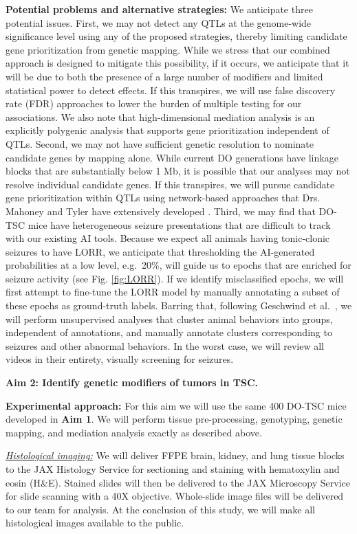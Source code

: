 \documentclass[
  12pt,
]{article}
\begin{document}
\textbf{Potential problems and alternative strategies:} We anticipate
three potential issues. First, we may not detect any QTLs at the
genome-wide significance level using any of the proposed strategies,
thereby limiting candidate gene prioritization from genetic mapping.
While we stress that our combined approach is designed to mitigate this
possibility, if it occurs, we anticipate that it will be due to both the
presence of a large number of modifiers and limited statistical power to
detect effects. If this transpires, we will use false discovery rate
(FDR) approaches \cite{24062767} to lower the burden of multiple testing
for our associations. We also note that high-dimensional mediation
analysis is an explicitly polygenic analysis that supports gene
prioritization independent of QTLs. Second, we may not have sufficient
genetic resolution to nominate candidate genes by mapping alone. While
current DO generations have linkage blocks that are substantially below
1 Mb, it is possible that our analyses may not resolve individual
candidate genes. If this transpires, we will pursue candidate gene
prioritization within QTLs using network-based approaches that Drs.
Mahoney and Tyler have extensively developed \cite{33889174, 31645420}.
Third, we may find that DO-TSC mice have heterogeneous seizure
presentations that are difficult to track with our existing AI tools.
Because we expect all animals having tonic-clonic seizures to have LORR,
we anticipate that thresholding the AI-generated probabilities at a low
level, e.g.~20\%, will guide us to epochs that are enriched for seizure
activity (see Fig. \ref{fig:LORR}). If we identify misclassified epochs,
we will first attempt to fine-tune the LORR model by manually annotating
a subset of these epochs as ground-truth labels. Barring that, following
Geschwind et al.~\cite{36841241}, we will perform unsupervised analyses
that cluster animal behaviors into groups, independent of annotations,
and manually annotate clusters corresponding to seizures and other
abnormal behaviors. In the worst case, we will review all videos in
their entirety, visually screening for seizures.

\textbf{Aim 2: Identify genetic modifiers of tumors in TSC.}

\textbf{Experimental approach:} For this aim we will use the same 400
DO-TSC mice developed in \textbf{Aim 1}. We will perform tissue
pre-processing, genotyping, genetic mapping, and mediation analysis
exactly as described above.

\textit{\underline{Histological imaging:}} We will deliver FFPE brain,
kidney, and lung tissue blocks to the JAX Histology Service for
sectioning and staining with hematoxylin and eosin (H\&E). Stained
slides will then be delivered to the JAX Microscopy Service for slide
scanning with a 40X objective. Whole-slide image files will be delivered
to our team for analysis. At the conclusion of this study, we will make
all histological images available to the public.
\end{document}
